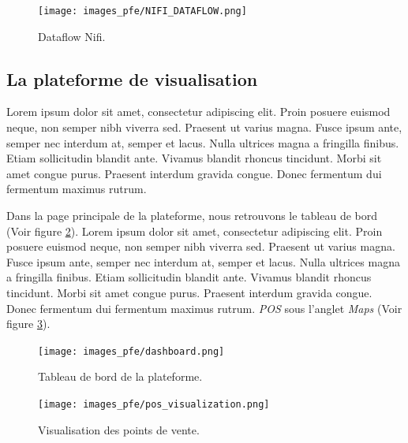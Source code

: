 \begin{figure}[hbt!]
  \centering
  \texttt{[image: images\_pfe/NIFI\_DATAFLOW.png]}
  \caption{Dataflow Nifi.}
  \label{fig:nifi-dataflow}
\end{figure}
\FloatBarrier

\subsection{La plateforme de visualisation}
Lorem ipsum dolor sit amet, consectetur adipiscing elit. Proin posuere euismod neque, non semper nibh viverra sed. Praesent ut varius magna. Fusce ipsum ante, semper nec interdum at, semper et lacus. Nulla ultrices magna a fringilla finibus. Etiam sollicitudin blandit ante. Vivamus blandit rhoncus tincidunt. Morbi sit amet congue purus. Praesent interdum gravida congue. Donec fermentum dui fermentum maximus rutrum.

\medskip

Dans la page principale de la plateforme, nous retrouvons le tableau de bord (Voir figure \ref{fig:dashboard-page}). Lorem ipsum dolor sit amet, consectetur adipiscing elit. Proin posuere euismod neque, non semper nibh viverra sed. Praesent ut varius magna. Fusce ipsum ante, semper nec interdum at, semper et lacus. Nulla ultrices magna a fringilla finibus. Etiam sollicitudin blandit ante. Vivamus blandit rhoncus tincidunt. Morbi sit amet congue purus. Praesent interdum gravida congue. Donec fermentum dui fermentum maximus rutrum. \textit{POS} sous l'anglet \textit{Maps} (Voir figure \ref{fig:pos-page}).

\medskip

\begin{figure}[hbt!]
  \centering
  \texttt{[image: images\_pfe/dashboard.png]}
  \caption{Tableau de bord de la plateforme.}
  \label{fig:dashboard-page}
\end{figure}
\FloatBarrier

\begin{figure}[hbt!]
  \centering
  \texttt{[image: images\_pfe/pos\_visualization.png]}
  \caption{Visualisation des points de vente.}
  \label{fig:pos-page}
\end{figure}
\FloatBarrier

